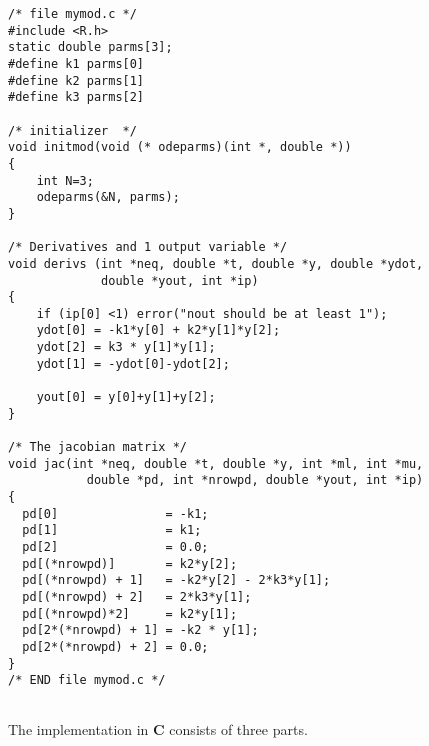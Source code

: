 \documentclass[english]{article}
\newcommand{\C}{\textbf{\textsf{C}}\xspace}
\begin{document}
\begin{verbatim}
/* file mymod.c */
#include <R.h>
static double parms[3];
#define k1 parms[0]
#define k2 parms[1]
#define k3 parms[2]

/* initializer  */
void initmod(void (* odeparms)(int *, double *))
{
    int N=3;
    odeparms(&N, parms);
}

/* Derivatives and 1 output variable */
void derivs (int *neq, double *t, double *y, double *ydot,
             double *yout, int *ip)
{
    if (ip[0] <1) error("nout should be at least 1");
    ydot[0] = -k1*y[0] + k2*y[1]*y[2];
    ydot[2] = k3 * y[1]*y[1];
    ydot[1] = -ydot[0]-ydot[2];

    yout[0] = y[0]+y[1]+y[2];
}

/* The jacobian matrix */
void jac(int *neq, double *t, double *y, int *ml, int *mu,
           double *pd, int *nrowpd, double *yout, int *ip)
{
  pd[0]               = -k1;
  pd[1]               = k1;
  pd[2]               = 0.0;
  pd[(*nrowpd)]       = k2*y[2];
  pd[(*nrowpd) + 1]   = -k2*y[2] - 2*k3*y[1];
  pd[(*nrowpd) + 2]   = 2*k3*y[1];
  pd[(*nrowpd)*2]     = k2*y[1];
  pd[2*(*nrowpd) + 1] = -k2 * y[1];
  pd[2*(*nrowpd) + 2] = 0.0;
}
/* END file mymod.c */


\end{verbatim}
The implementation in \C consists of three parts.
\end{document}
